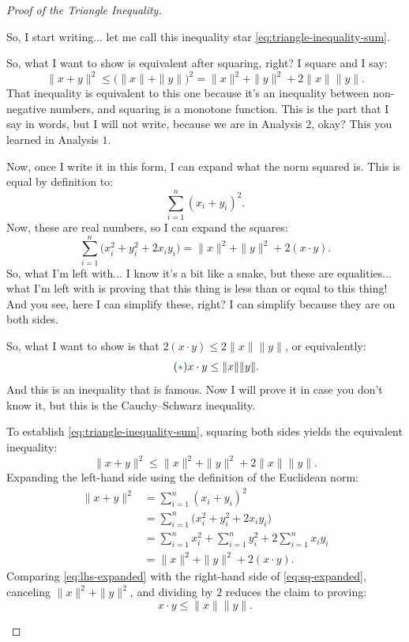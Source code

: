 \begin{proof}[Proof of the Triangle Inequality]
\begin{spoken-clean}[00:57:09 - 01:01:21]
So, I start writing... let me call this inequality star \eqref{eq:triangle-inequality-sum}.

So, what I want to show is equivalent after squaring, right? I square and I say:
\[
\|x + y\|^2 \le \bigl( \|x\| + \|y\| \bigr)^2 = \|x\|^2 + \|y\|^2 + 2 \|x\| \|y\|.
\]
That inequality is equivalent to this one because it's an inequality between non-negative numbers, and squaring is a monotone function. This is the part that I say in words, but I will not write, because we are in Analysis $2$, okay? This you learned in Analysis $1$.

Now, once I write it in this form, I can expand what the norm squared is. This is equal by definition to:
\[
\sum_{i=1}^n (x_i + y_i)^2.
\]
Now, these are real numbers, so I can expand the squares:
\[
\sum_{i=1}^n \bigl( x_i^2 + y_i^2 + 2 x_i y_i \bigr) = \|x\|^2 + \|y\|^2 + 2 (x \cdot y).
\]
So, what I'm left with... I know it's a bit like a snake, but these are equalities... what I'm left with is proving that this thing is less than or equal to this thing! And you see, here I can simplify these, right? I can simplify because they are on both sides.

So, what I want to show is that $2 (x \cdot y) \le 2 \|x\| \|y\|$, or equivalently:
\begin{equation}\tag{\textcolor{ForestGreen}{$\star$}}\label{eq:cauchy-schwarz-target}
x \cdot y \le \|x\| \|y\|.
\end{equation}
And this is an inequality that is famous. Now I will prove it in case you don't know it, but this is the Cauchy--Schwarz inequality.
\end{spoken-clean}

\begin{math-stroke}
To establish \eqref{eq:triangle-inequality-sum}, squaring both sides yields the equivalent inequality:
\begin{equation}\label{eq:sq-expanded}
\|x + y\|^2 \le \|x\|^2 + \|y\|^2 + 2 \|x\| \|y\|.
\end{equation}
Expanding the left-hand side using the definition of the Euclidean norm:
\begin{align}
\|x + y\|^2 &= \sum_{i=1}^n (x_i + y_i)^2 \nonumber \\
&= \sum_{i=1}^n \bigl( x_i^2 + y_i^2 + 2 x_i y_i \bigr) \nonumber \\
&= \sum_{i=1}^n x_i^2 + \sum_{i=1}^n y_i^2 + 2 \sum_{i=1}^n x_i y_i \nonumber \\
&= \|x\|^2 + \|y\|^2 + 2 (x \cdot y). \label{eq:lhs-expanded}
\end{align}
Comparing \eqref{eq:lhs-expanded} with the right-hand side of \eqref{eq:sq-expanded}, canceling $\|x\|^2 + \|y\|^2$, and dividing by $2$ reduces the claim to proving:
\begin{equation}\label{eq:cs-reduced}
x \cdot y \le \|x\| \|y\|.
\end{equation}
\end{math-stroke}


\end{proof}
